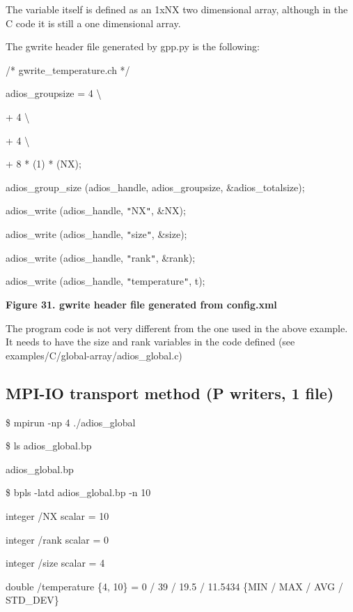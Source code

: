 The variable itself is defined as an 1xNX two dimensional array, although in the 
C code it is still a one dimensional array. 

The gwrite header file generated by gpp.py is the following:

/* gwrite\_temperature.ch */

adios\_groupsize = 4 \textbackslash{}

\parindent=115pt
+ 4 \textbackslash{}

+ 4 \textbackslash{}

\parindent=230pt
+ 8 * (1) * (NX);

\parindent=0pt
adios\_group\_size (adios\_handle, adios\_groupsize, \&adios\_totalsize);

adios\_write (adios\_handle, \texttt{"}NX\texttt{"}, \&NX);

{\color{color02} adios\_write (adios\_handle, \texttt{"}size\texttt{"}, \&size);}

{\color{color02} adios\_write (adios\_handle, \texttt{"}rank\texttt{"}, \&rank);}

adios\_write (adios\_handle, \texttt{"}temperature\texttt{"}, t);

\label{HToc144350190}

\leftskip=18pt
{\color{color20} \textbf{Figure 31. gwrite header file generated from config.xml}}

\leftskip=0pt
The program code is not very different from the one used in the above example. 
It needs to have the size and rank variables in the code defined (see examples/C/global-array/adios\_global.c) 
\label{HToc182553448}

\subsection{MPI-IO transport method (P writers, 1 file)}

\$ mpirun -np 4 ./adios\_global

\$ ls adios\_global.bp 

adios\_global.bp

\$  bpls -latd adios\_global.bp -n 10

integer    /NX                       scalar = 10

\parindent=3pt
integer    /rank                     scalar = 0

integer    /size                     scalar = 4

\parindent=7pt
double     /temperature              \{4, 10\} = 0 / 39 / 19.5 / 11.5434  \{MIN 
/ MAX / AVG / STD\_DEV\}

